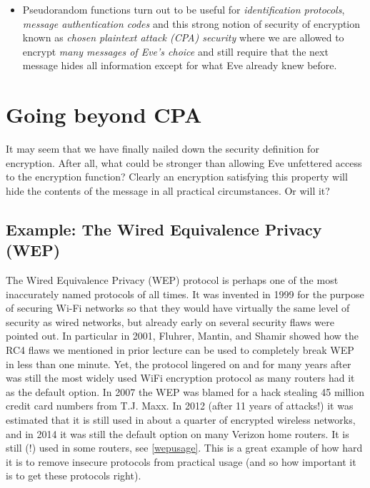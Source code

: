 \begin{itemize}
{  collection}: this is a collection \(\{ f_s \}\) of functions such that
  if we choose \(s\) at random and fix it, and give an adversary a black
  box computing \(i \mapsto f_s(i)\) then she can't tell the difference
  between this and a blackbox computing a random function.\footnote{This
    was done by
    \href{https://www.wisdom.weizmann.ac.il/~oded/X/ggm.pdf}{Goldreich,
    Goldwasser and Micali}.}
\item
  Pseudorandom functions turn out to be useful for \emph{identification
  protocols}, \emph{message authentication codes} and this strong notion
  of security of encryption known as \emph{chosen plaintext attack (CPA)
  security} where we are allowed to encrypt \emph{many messages of Eve's
  choice} and still require that the next message hides all information
  except for what Eve already knew before.
\end{itemize}

\section{Going beyond CPA}\label{6-Going-beyond-CPA}

It may seem that we have finally nailed down the security definition for
encryption. After all, what could be stronger than allowing Eve
unfettered access to the encryption function? Clearly an encryption
satisfying this property will hide the contents of the message in all
practical circumstances. Or will it?


\subsection{Example: The Wired Equivalence Privacy
(WEP)}\label{6-Example-The-Wired-Equi}

The Wired Equivalence Privacy (WEP) protocol is perhaps one of the most
inaccurately named protocols of all times. It was invented in 1999 for
the purpose of securing Wi-Fi networks so that they would have virtually
the same level of security as wired networks, but already early on
several security flaws were pointed out. In particular in 2001, Fluhrer,
Mantin, and Shamir showed how the RC4 flaws we mentioned in prior
lecture can be used to completely break WEP in less than one minute.
Yet, the protocol lingered on and for many years after was still the
most widely used WiFi encryption protocol as many routers had it as the
default option. In 2007 the WEP was blamed for a hack stealing 45
million credit card numbers from T.J. Maxx. In 2012 (after 11 years of
attacks!) it was estimated that it is still used in about a quarter of
encrypted wireless networks, and in 2014 it was still the default option
on many Verizon home routers. It is still (!) used in some routers, see
\cref{wepusage}. This is a great example of how hard it is to remove
insecure protocols from practical usage (and so how important it is to
get these protocols right).

